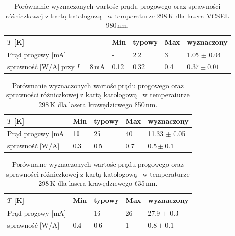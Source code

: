 \begin{table}[H]
\begin{center}
\label{tab:tabela2}
\caption{Porównanie wyznaczonych wartośc prądu progowego oraz sprawności różniczkowej z kartą katologową~\cite{spec_vcsel_980}
 w temperaturze 298\,K dla lasera VCSEL 980\,nm. }
\begin{tabular}{ | C{3.5cm}|  C{1.5cm} | C{1.5cm} | C{1.5cm}| C{3.5cm}|}
\hline
$T$ [K]           &   Min  & typowy & Max   & wyznaczony        \\ \hline
Prąd progowy [mA] &  -    &  2.2    & 3    & 1.05 $\pm$ 0.04  \\ \hline
sprawność [W/A]  przy $I$ = 8\,mA   &  0.12   &  0.32   & 0.4   & $0.37 \pm 0.01$     \\ \hline
\end{tabular}
\end{center}
\end{table}

\begin{table}[H]
\begin{center}
\label{tab:tabela3}
\caption{Porównanie wyznaczonych wartośc prądu progowego oraz sprawności różniczkowej z kartą katologową~\cite{spec_edge_850}
 w temperaturze 298\,K dla lasera krawędziowego 850\,nm. }
\begin{tabular}{ | C{3.5cm}|  C{1.5cm} | C{1.5cm} | C{1.5cm}| C{3.5cm}|}
\hline
$T$ [K]           &   Min  & typowy & Max   & wyznaczony        \\ \hline
Prąd progowy [mA] &  10    &  25    & 40    & 11.33 $\pm$ 0.05  \\ \hline
sprawność [W/A]     &  0.3   &  0.5   & 0.7   & $0.5 \pm 0.1$     \\ \hline
\end{tabular}
\end{center}
\end{table}
\begin{table}[H]
\begin{center}
\label{tab:tabela4}
\caption{Porównanie wyznaczonych wartośc prądu progowego oraz sprawności różniczkowej z kartą katologową~\cite{spec_edge_635}
 w temperaturze 298\,K dla lasera krawędziowego 635\,nm. }
\begin{tabular}{ | C{3.5cm}|  C{1.5cm} | C{1.5cm} | C{1.5cm}| C{3.5cm}|}
\hline
$T$ [K]           &   Min  & typowy & Max   & wyznaczony        \\ \hline
Prąd progowy [mA] &  -    &  16    & 26    & 27.9 $\pm$ 0.3  \\ \hline
sprawność [W/A]      &  0.4   &  0.6   & 1  &  $0.8 \pm 0.1$       \\ \hline
\end{tabular}
\end{center}
\end{table}

